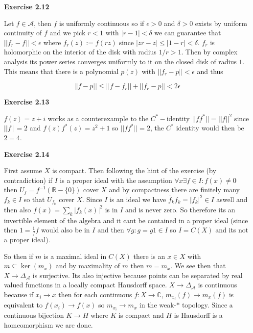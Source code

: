 \documentclass{article}
\begin{document}
\vspace{0.5cm}

\textbf{Exercise 2.12}

\vspace{0.5cm}

Let $f \in \mathcal A$, then $f$ is uniformly continuous so if $\epsilon > 0$ and $\delta > 0$ exists by uniform continuity of $f$ and we pick $r < 1$ with $|r-1| < \delta$ we can guarantee that $||f_r - f|| < \epsilon$ where $f_r(z) := f(rz)$ since $|zr - z| \leq |1-r| < \delta$. $f_r$ is holomorphic on the interior of the disk with radius $1/r > 1$. Then by complex analysis its power series converges uniformly to it on the closed disk of radius $1$. This means that there is a polynomial $p(z)$ with $||f_r-p|| < \epsilon$ and thus 

$$||f - p|| \leq ||f - f_r|| + ||f_r - p|| < 2 \epsilon$$

\vspace{0.5cm}

\textbf{Exercise 2.13}

\vspace{0.5cm}

$f(z) = z + i$ works as a counterexample to the $C^*-$identity $||ff^*|| = ||f||^2$ since $||f|| = 2$ and $f(z)f^*(z) = z^2 + 1$ so $||ff^*|| = 2$, the $C^*$ identity would then be $2 = 4$.

\vspace{0.5cm}

\textbf{Exercise 2.14}

\vspace{0.5cm}

First assume $X$ is compact. Then following the hint of the exercise (by contradiction) if $I$ is a proper ideal with the assumption $\forall x \exists f \in I : f(x) \neq 0$ then $U_f = f^{-1}(\mathbb{R} - \{0\})$ cover $X$ and by compactness there are finitely many $f_k \in I$ so that $U_{f_k}$ cover $X$. Since $I$ is an ideal we have $\bar f_k f_k = |f_k|^2 \in I$ aswell and then also $f(x) = \sum\limits_{k} |f_k(x)|^2$ is in $I$ and is never zero. So therefore its an invertible element of the algebra and it cant be contained in a proper ideal (since then $1 = \frac{1}{f} f$ would also be in $I$ and then $\forall g:g = g 1 \in I$ so $I = C(X)$ and its not a proper ideal). 

\vspace{0.2cm}

So then if $m$ is a maximal ideal in $C(X)$ there is an $x \in X$ with $m \subseteq \ker(m_x)$ and by maximality of $m$ then $m = m_x$. We see then that $X \rightarrow \Delta_\mathcal A$ is surjective. Its also injective because points can be separated by real valued functions in a locally compact Hausdorff space. $X \rightarrow \Delta_\mathcal A$ is continuous because if $x_i \rightarrow x$ then for each continuous $f: X \rightarrow \mathbb C$, $m_{x_i}(f) \rightarrow m_x(f)$ is equivalent to $f(x_i) \rightarrow f(x)$ so $m_{x_i} \rightarrow m_x$ in the weak-$*$ topology. Since a continuous bijection $K \rightarrow H$ where $K$ is compact and $H$ is Hausdorff is a homeomorphism we are done.
\end{document}

